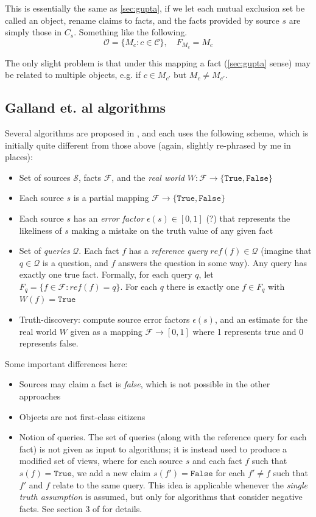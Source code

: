 \documentclass{article}
\theoremstyle{definition} \newtheorem{definition}{Definition}
\theoremstyle{definition} \newtheorem{example}{Example}
\theoremstyle{plain} \newtheorem{axiom}{Axiom}
\theoremstyle{plain} \newtheorem*{remark}{Remark}
\theoremstyle{remark} \newtheorem*{notation}{Notation}
\theoremstyle{plain} \newtheorem{lemma}{Lemma}
\theoremstyle{plain} \newtheorem{theorem}{Theorem}
\theoremstyle{plain} \newtheorem{proposition}{Proposition}
\renewcommand{\S}{\mathcal{S}}  %
\renewcommand{\O}{\mathcal{O}}  %
\newcommand{\F}{\mathcal{F}}
\begin{document}
This is essentially the same as \ref{sec:gupta}, if we let each mutual
exclusion set be called an object, rename claims to facts, and the facts
provided by source $s$ are simply those in $C_s$. Something like the following.
$$
\O = \{M_c : c \in \mathcal{C}\},
\quad
F_{M_c} = M_c
$$

The only slight problem is that under this mapping a fact (\ref{sec:gupta}
sense) may be related to multiple objects, e.g. if $c \in M_{c'}$ but $M_c \ne
M_{c'}$.

\subsection{Galland et. al algorithms}
\label{sec:galland}

Several algorithms are proposed in \cite{galland}, and each uses the following
scheme, which is initially quite different from those above (again, slightly
re-phrased by me in places):

\begin{itemize}
\item Set of sources $\S$, facts $\F$, and the \emph{real world}
$W: \F \rightarrow \{\texttt{True}, \texttt{False}\}$
\item Each source $s$ is a partial mapping $\F \rightarrow
\{\texttt{True}, \texttt{False}\}$
\item Each source $s$ has an \emph{error factor} $\epsilon(s) \in [0, 1]$ (?)
that represents the likeliness of $s$ making a mistake on the truth value of
any given fact
\item Set of \emph{queries} $\mathcal{Q}$. Each fact $f$ has a \emph{reference
query} $ref(f) \in \mathcal{Q}$ (imagine that $q\in\mathcal{Q}$ is a question,
and $f$ answers the question in some way). Any query has exactly one true fact.
Formally, for each query $q$, let $F_q = \{f \in \F : ref(f) = q\}$.
For each $q$ there is exactly one $f \in F_q$ with $W(f) = \texttt{True}$ \item
Truth-discovery: compute source error factors $\epsilon(s)$, and an estimate
for the real world $W$ given as a mapping $\F \rightarrow [0, 1]$ where 1
represents true and 0 represents false.
\end{itemize}

Some important differences here:
\begin{itemize}
\item Sources may claim a fact is \emph{false}, which is not possible in the
other approaches
\item Objects are not first-class citizens
\item Notion of queries. The set of queries (along with the reference query for
each fact) is not given as input to algorithms; it is instead used to produce a
modified set of views, where for each source $s$ and each fact $f$ such that
$s(f) = \texttt{True}$, we add a new claim $s(f')=\texttt{False}$ for each
$f' \ne f$ such that $f'$ and $f$ relate to the same query. This idea is
applicable whenever the \emph{single truth assumption} is assumed, but only for
algorithms that consider negative facts. See section 3 of \cite{galland} for
details.
\end{itemize}
\end{document}
